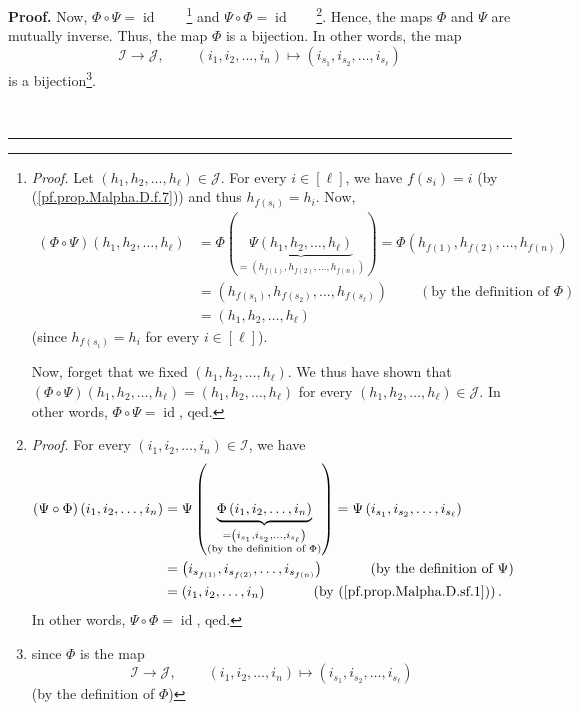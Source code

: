 \documentclass[numbers=enddot,12pt,final,onecolumn,notitlepage,abstracton]{scrartcl}
\theoremstyle{definition}
\newenvironment{proof}[1][Proof]{\noindent\textbf{#1.} }{\ \rule{0.5em}{0.5em}}
\newenvironment{verlong}{}{}
\begin{document}
\begin{verlong}
\begin{footnotesize}
\begin{proof}
Now, $\Phi\circ\Psi=\operatorname*{id}$\ \ \ \ \footnote{\textit{Proof.} Let
$\left(  h_{1},h_{2},\ldots,h_{\ell}\right)  \in\mathcal{J}$. For every
$i\in\left[  \ell\right]  $, we have $f\left(  s_{i}\right)  =i$ (by
(\ref{pf.prop.Malpha.D.f.7})) and thus $h_{f\left(  s_{i}\right)  }=h_{i}$.
Now,%
\begin{align*}
\left(  \Phi\circ\Psi\right)  \left(  h_{1},h_{2},\ldots,h_{\ell}\right)   &
=\Phi\left(  \underbrace{\Psi\left(  h_{1},h_{2},\ldots,h_{\ell}\right)
}_{=\left(  h_{f\left(  1\right)  },h_{f\left(  2\right)  },\ldots,h_{f\left(
n\right)  }\right)  }\right)  =\Phi\left(  h_{f\left(  1\right)  },h_{f\left(
2\right)  },\ldots,h_{f\left(  n\right)  }\right) \\
&  =\left(  h_{f\left(  s_{1}\right)  },h_{f\left(  s_{2}\right)  }%
,\ldots,h_{f\left(  s_{\ell}\right)  }\right)  \ \ \ \ \ \ \ \ \ \ \left(
\text{by the definition of }\Phi\right) \\
&  =\left(  h_{1},h_{2},\ldots,h_{\ell}\right)
\end{align*}
(since $h_{f\left(  s_{i}\right)  }=h_{i}$ for every $i\in\left[  \ell\right]
$).
\par
Now, forget that we fixed $\left(  h_{1},h_{2},\ldots,h_{\ell}\right)  $. We
thus have shown that $\left(  \Phi\circ\Psi\right)  \left(  h_{1},h_{2}%
,\ldots,h_{\ell}\right)  =\left(  h_{1},h_{2},\ldots,h_{\ell}\right)  $ for
every $\left(  h_{1},h_{2},\ldots,h_{\ell}\right)  \in\mathcal{J}$. In other
words, $\Phi\circ\Psi=\operatorname*{id}$, qed.} and $\Psi\circ\Phi
=\operatorname*{id}$ \ \ \ \footnote{\textit{Proof.} For every $\left(
i_{1},i_{2},\ldots,i_{n}\right)  \in\mathcal{I}$, we have%
\begin{align*}
\left(  \Psi\circ\Phi\right)  \left(  i_{1},i_{2},\ldots,i_{n}\right)   &
=\Psi\left(  \underbrace{\Phi\left(  i_{1},i_{2},\ldots,i_{n}\right)
}_{\substack{=\left(  i_{s_{1}},i_{s_{2}},\ldots,i_{s_{\ell}}\right)
\\\text{(by the definition of }\Phi\text{)}}}\right)  =\Psi\left(  i_{s_{1}%
},i_{s_{2}},\ldots,i_{s_{\ell}}\right) \\
&  =\left(  i_{s_{f\left(  1\right)  }},i_{s_{f\left(  2\right)  }}%
,\ldots,i_{s_{f\left(  n\right)  }}\right)  \ \ \ \ \ \ \ \ \ \ \left(
\text{by the definition of }\Psi\right) \\
&  =\left(  i_{1},i_{2},\ldots,i_{n}\right)  \ \ \ \ \ \ \ \ \ \ \left(
\text{by (\ref{pf.prop.Malpha.D.sf.1})}\right)  .
\end{align*}
In other words, $\Psi\circ\Phi=\operatorname*{id}$, qed.}. Hence, the maps
$\Phi$ and $\Psi$ are mutually inverse. Thus, the map $\Phi$ is a bijection.
In other words, the map
\[
\mathcal{I}\rightarrow\mathcal{J},\ \ \ \ \ \ \ \ \ \ \left(  i_{1}%
,i_{2},\ldots,i_{n}\right)  \mapsto\left(  i_{s_{1}},i_{s_{2}},\ldots
,i_{s_{\ell}}\right)
\]
is a bijection\footnote{since $\Phi$ is the map
\[
\mathcal{I}\rightarrow\mathcal{J},\ \ \ \ \ \ \ \ \ \ \left(  i_{1}%
,i_{2},\ldots,i_{n}\right)  \mapsto\left(  i_{s_{1}},i_{s_{2}},\ldots
,i_{s_{\ell}}\right)
\]
(by the definition of $\Phi$)}.


\end{proof}
\end{footnotesize}
\end{verlong}
\end{document}
